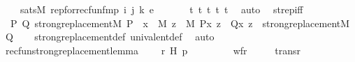 \begin{isabellebody}
\ \ \ {\isasymlongleftrightarrow}\ sats{\isacharparenleft}{\kern0pt}M{\isacharcomma}{\kern0pt}\ rep{\isacharunderscore}{\kern0pt}for{\isacharunderscore}{\kern0pt}recfun{\isacharunderscore}{\kern0pt}fm{\isacharparenleft}{\kern0pt}p{\isacharcomma}{\kern0pt}\ i{\isacharcomma}{\kern0pt}\ j{\isacharcomma}{\kern0pt}\ k{\isacharparenright}{\kern0pt}{\isacharcomma}{\kern0pt}\ e{\isacharparenright}{\kern0pt}{\isachardoublequoteclose}\ \isanewline
\ \ \ \ \isamarkupfalse%
\ t{}\ t{}\ t{}\ t{}\ t{}\ \isamarkupfalse%
\ auto\ \isanewline
{}\isamarkupfalse%
%
\endisatagproof
{\isafoldproof}%
%
\isadelimproof
\isanewline
%
\endisadelimproof
\isanewline
{}\isamarkupfalse%
\ strep{\isacharunderscore}{\kern0pt}iff\ {\isacharcolon}{\kern0pt}\ \isanewline
\ \ {\isachardoublequoteopen}{\isasymAnd}P\ Q{\isachardot}{\kern0pt}\ strong{\isacharunderscore}{\kern0pt}replacement{\isacharparenleft}{\kern0pt}{\isacharhash}{\kern0pt}{\isacharhash}{\kern0pt}M{\isacharcomma}{\kern0pt}\ P{\isacharparenright}{\kern0pt}\ {\isasymLongrightarrow}\ {\isasymforall}x\ {\isasymin}\ M{\isachardot}{\kern0pt}\ {\isasymforall}z\ {\isasymin}\ M{\isachardot}{\kern0pt}\ P{\isacharparenleft}{\kern0pt}x{\isacharcomma}{\kern0pt}\ z{\isacharparenright}{\kern0pt}\ {\isasymlongleftrightarrow}\ Q{\isacharparenleft}{\kern0pt}x{\isacharcomma}{\kern0pt}\ z{\isacharparenright}{\kern0pt}\ {\isasymLongrightarrow}\ strong{\isacharunderscore}{\kern0pt}replacement{\isacharparenleft}{\kern0pt}{\isacharhash}{\kern0pt}{\isacharhash}{\kern0pt}M{\isacharcomma}{\kern0pt}\ Q{\isacharparenright}{\kern0pt}{\isachardoublequoteclose}\isanewline
%
\isadelimproof
\ \ %
\endisadelimproof
%
\isatagproof
{}\isamarkupfalse%
\ strong{\isacharunderscore}{\kern0pt}replacement{\isacharunderscore}{\kern0pt}def\ univalent{\isacharunderscore}{\kern0pt}def\ \isamarkupfalse%
\ auto%
\endisatagproof
{\isafoldproof}%
%
\isadelimproof
\ \isanewline
%
\endisadelimproof
\isanewline
{}\isamarkupfalse%
\ recfun{\isacharunderscore}{\kern0pt}strong{\isacharunderscore}{\kern0pt}replacement{\isacharunderscore}{\kern0pt}lemma\ {\isacharcolon}{\kern0pt}\isanewline
\ \ \ r\ H\ p\ \isanewline
\ \ \ \isanewline
\ \ \ \ {\isachardoublequoteopen}wf{\isacharparenleft}{\kern0pt}r{\isacharparenright}{\kern0pt}{\isachardoublequoteclose}\ \isanewline
\ \ \ \ {\isachardoublequoteopen}trans{\isacharparenleft}{\kern0pt}r{\isacharparenright}{\kern0pt}{\isachardoublequoteclose}\ \isanewline

\end{isabellebody}
